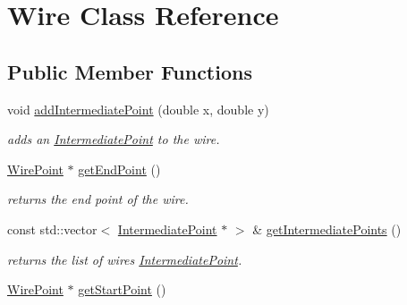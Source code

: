 \hypertarget{class_open_chams_1_1_wire}{}\section{Wire Class Reference}
\label{class_open_chams_1_1_wire}
\subsection*{Public Member Functions}
\begin{DoxyCompactItemize}
\item 
void \hyperlink{class_open_chams_1_1_wire_aab66049b1f5ccf8de85249720152833a}{add\+Intermediate\+Point} (double x, double y)
\begin{DoxyCompactList}\small\item\em adds an \hyperlink{class_open_chams_1_1_intermediate_point}{Intermediate\+Point} to the wire. \end{DoxyCompactList}\item 
\mbox{\label{class_open_chams_1_1_wire_ab1c91025a4117cede119f53d9eb8093b}} 
\hyperlink{class_open_chams_1_1_wire_point}{Wire\+Point} $\ast$ \hyperlink{class_open_chams_1_1_wire_ab1c91025a4117cede119f53d9eb8093b}{get\+End\+Point} ()
\begin{DoxyCompactList}\small\item\em returns the end point of the wire. \end{DoxyCompactList}\item 
\mbox{\label{class_open_chams_1_1_wire_aac2840e22e03db0ff2c0fe0f83c56fdd}} 
const std\+::vector$<$ \hyperlink{class_open_chams_1_1_intermediate_point}{Intermediate\+Point} $\ast$ $>$ \& \hyperlink{class_open_chams_1_1_wire_aac2840e22e03db0ff2c0fe0f83c56fdd}{get\+Intermediate\+Points} ()
\begin{DoxyCompactList}\small\item\em returns the list of wire\textquotesingle{}s \hyperlink{class_open_chams_1_1_intermediate_point}{Intermediate\+Point}. \end{DoxyCompactList}\item 
\mbox{\label{class_open_chams_1_1_wire_ad68ddfcb6d4cbbe3c06d03fb4350dcdb}} 
\hyperlink{class_open_chams_1_1_wire_point}{Wire\+Point} $\ast$ \hyperlink{class_open_chams_1_1_wire_ad68ddfcb6d4cbbe3c06d03fb4350dcdb}{get\+Start\+Point} ()

\end{DoxyCompactItemize}

